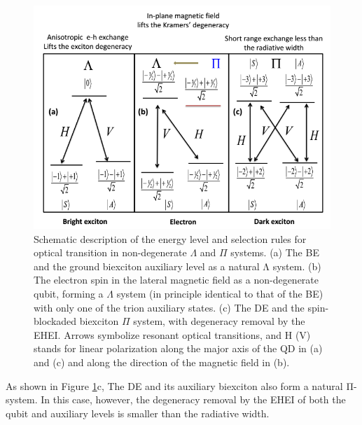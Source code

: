 \begin{figure}[H]
	\centering
	\includegraphics[scale=0.75]{figures/pI_System.png}
	\caption{Schematic description of the energy level and selection rules for
optical transition in non-degenerate $\Lambda$ and $\Pi$ systems. (a) The BE and the ground biexciton auxiliary level as a natural Λ system. (b) The electron spin in the lateral magnetic field as a non-degenerate qubit, forming a $\Lambda$ system (in principle identical to that of the BE) with only one of the trion auxiliary states. (c) The DE and the spin-blockaded biexciton $\Pi$ system, with degeneracy removal by the EHEI. Arrows symbolize resonant optical transitions, and H (V) stands for linear polarization along the major axis of the QD in (a) and (c) and along the direction of the magnetic field in (b).}
	\label{fig:LambdaSystem}
\end{figure}
As shown in Figure \ref{fig:LambdaSystem}c, The DE and its auxiliary biexciton also form a natural Π-system. In this case, however, the degeneracy removal by the EHEI of both the qubit and auxiliary levels is smaller than the radiative width.
